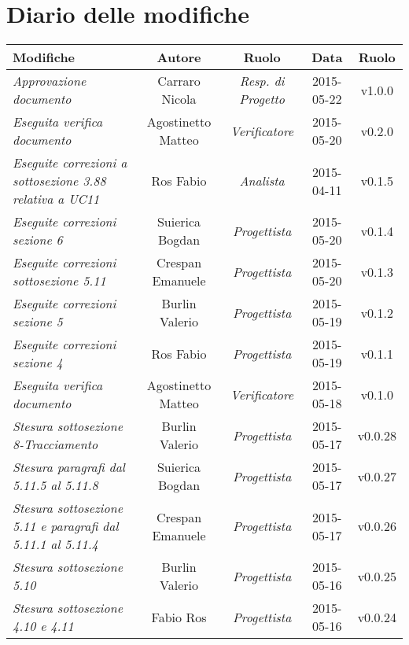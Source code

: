 \newpage
\section*{Diario delle modifiche}

\begin{table}[h]
\centering
\begin{tabular}{|p{}|c|c|c|c|}
	\toprule
		\textbf{Modifiche} & \textbf{Autore} & \textbf{Ruolo} & \textbf{Data} & \textbf{Ruolo} \\
	\midrule
		\textit{Approvazione documento} & Carraro Nicola & \textit{Resp. di Progetto} & 2015-05-22 & v1.0.0 \\
	\midrule
		\textit{Eseguita verifica documento} & Agostinetto Matteo & \textit{Verificatore} & 2015-05-20 & v0.2.0 \\
	\midrule
		\textit{Eseguite correzioni a sottosezione 3.88 relativa a UC11} & Ros Fabio & \textit{Analista} & 2015-04-11 & v0.1.5 \\
	\midrule
		\textit{Eseguite correzioni sezione 6} & Suierica Bogdan & \textit{Progettista} & 2015-05-20 & v0.1.4 \\
	\midrule
	\textit{Eseguite correzioni sottosezione 5.11} & Crespan Emanuele & \textit{Progettista} & 2015-05-20 & v0.1.3 \\
	\midrule
		\textit{Eseguite correzioni sezione 5} & Burlin Valerio & \textit{Progettista} & 2015-05-19 & v0.1.2 \\
	\midrule
		\textit{Eseguite correzioni sezione 4} & Ros Fabio & \textit{Progettista} & 2015-05-19 & v0.1.1 \\
	\midrule
		\textit{Eseguita verifica documento} & Agostinetto Matteo & \textit{Verificatore} & 2015-05-18 & v0.1.0 \\
	\midrule
	\textit{Stesura sottosezione 8-Tracciamento} & Burlin Valerio & \textit{Progettista} & 2015-05-17 & v0.0.28 \\
	\midrule
		\textit{Stesura paragrafi dal 5.11.5 al 5.11.8} & Suierica Bogdan & \textit{Progettista} & 2015-05-17 & v0.0.27 \\ 
	\midrule
		\textit{Stesura sottosezione 5.11 e paragrafi dal 5.11.1 al 5.11.4} & Crespan Emanuele & \textit{Progettista} & 2015-05-17 & v0.0.26 \\
	\midrule
		\textit{Stesura sottosezione 5.10} & Burlin Valerio & \textit{Progettista} & 2015-05-16 & v0.0.25 \\					
	\midrule
		\textit{Stesura sottosezione 4.10 e 4.11} & Fabio Ros & \textit{Progettista} & 2015-05-16 & v0.0.24 \\

\end{tabular}
\end{table}
